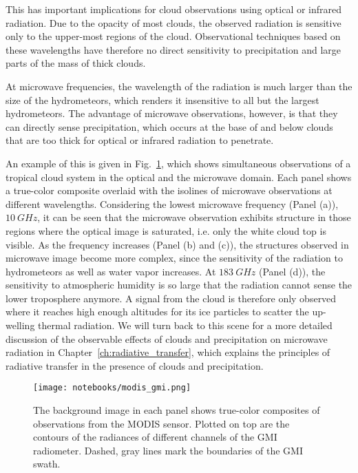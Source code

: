 This has important implications for cloud observations using optical or infrared
radiation. Due to the opacity of most clouds, the observed radiation is
sensitive only to the upper-most regions of the cloud. Observational techniques
based on these wavelengths have therefore no direct sensitivity to precipitation
and large parts of the mass of thick clouds.

At microwave frequencies, the wavelength of the radiation is much larger than
the size of the hydrometeors, which renders it insensitive to all but the
largest hydrometeors. The advantage of microwave observations, however, is that
they can directly sense precipitation, which occurs at the base of and below
clouds that are too thick for optical or infrared radiation to penetrate.

An example of this is given in Fig.~\ref{fig:modis_gmi}, which shows simultaneous
observations of a tropical cloud system in the optical and the microwave
domain. Each panel shows a true-color composite overlaid with the
isolines of microwave observations at different wavelengths. Considering the
lowest microwave frequency (Panel (a)), $10\ \unit{GHz}$, it can be seen that
the microwave observation exhibits structure in those regions where the optical
image is saturated, i.e. only the white cloud top is visible. As the frequency
increases (Panel (b) and (c)), the structures observed in microwave image become
more complex, since the sensitivity of the radiation to hydrometeors as well as
water vapor increases. At $183\ \unit{GHz}$ (Panel (d)), the sensitivity to
atmospheric humidity is so large that the radiation cannot sense the lower
troposphere anymore. A signal from the cloud is therefore only observed where it
reaches high enough altitudes for its ice particles to scatter the up-welling thermal
radiation. We will turn back to this scene for a more detailed discussion of the
observable effects of clouds and precipitation on microwave radiation in
Chapter~\ref{ch:radiative_transfer}, which explains the principles of radiative
transfer in the presence of clouds and precipitation.

\begin{figure}
\texttt{[image: notebooks/modis\_gmi.png]}
\caption{The background image in each panel shows true-color composites of
  observations from the MODIS sensor. Plotted on top are the contours of the
  radiances of different channels of the GMI \parencite{draper15} radiometer.
  Dashed, gray lines mark the boundaries of the GMI swath.}
\label{fig:modis_gmi}
\end{figure}


